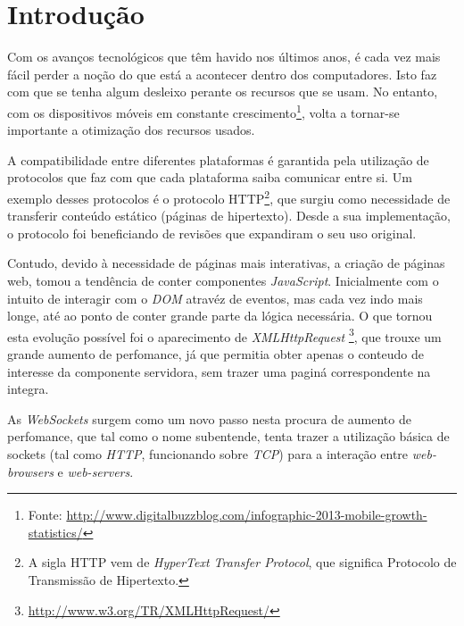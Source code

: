 \documentclass[a4paper]{article}
\begin{document}

\newpage
\thispagestyle{empty} %

\tableofcontents

\newpage
\setcounter{page}{1} %

\section{Introdução}

Com os avanços tecnológicos que têm havido nos últimos anos, é cada vez mais fácil perder a noção
do que está a acontecer dentro dos computadores. Isto faz com que se tenha algum desleixo perante os recursos que se usam. No entanto, com os dispositivos móveis em constante crescimento\footnote{Fonte: \url{http://www.digitalbuzzblog.com/infographic-2013-mobile-growth-statistics/}}, volta a tornar-se importante a otimização dos recursos usados.

A compatibilidade entre diferentes plataformas é garantida pela utilização de protocolos que faz com que cada plataforma saiba comunicar entre si. Um exemplo desses protocolos é o protocolo HTTP\footnote{A sigla HTTP vem de \emph{HyperText Transfer Protocol}, que significa Protocolo de Transmissão de Hipertexto.}, que surgiu como necessidade de transferir conteúdo estático (páginas de hipertexto). Desde a sua implementação, o protocolo foi beneficiando de revisões que expandiram o seu uso original.

Contudo, devido à necessidade de páginas mais interativas, a criação de páginas web, tomou a tendência de conter componentes \emph{JavaScript}. Inicialmente com o intuito de interagir com o \emph{DOM} atravéz de eventos, mas cada vez indo mais longe, até ao ponto de conter grande parte da lógica necessária. O que tornou esta evolução possível foi o aparecimento de \emph{XMLHttpRequest} \footnote{\url{http://www.w3.org/TR/XMLHttpRequest/}}, que trouxe um grande aumento de perfomance, já que permitia obter apenas o conteudo de interesse da componente servidora, sem trazer uma paginá correspondente na integra.

As \emph{WebSockets} surgem como um novo passo nesta procura de aumento de perfomance, que tal como o nome subentende, tenta trazer a utilização básica de sockets (tal como \emph{HTTP}, funcionando sobre \emph{TCP}) para a interação entre \emph{web-browsers} e \emph{web-servers}.
\end{document}
